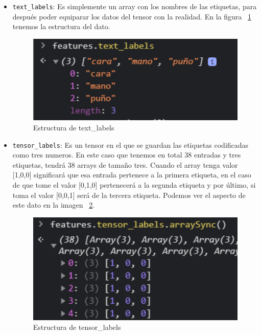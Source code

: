 \documentclass[a4paper, 12pt]{book}
\begin{document}
\begin{itemize}
  
	\item \texttt{text\_labels}: Es simplemente un array con los nombres de las etiquetas, para después poder equiparar los datos del tensor con la realidad. En la figura ~\ref{fig:textlabels} tenemos la estructura del dato.

\begin{figure}
	\centering
	\includegraphics[width=12cm, keepaspectratio]{img/textlabels}
	\caption{Estructura de text\_labels}				
	\label{fig:textlabels}
\end{figure}

	\item \texttt{tensor\_labels}: Es un tensor en el que se guardan las etiquetas codificadas como tres numeros. En este caso que tenemos en total 38 entradas y tres etiquetas, tendrá 38 arrays de tamaño tres. Cuando el array tenga valor [1,0,0] significará que esa entrada pertenece a la primera etiqueta, en el caso de que tome el valor [0,1,0] pertenecerá a la segunda etiqueta y por último, si toma el valor [0,0,1] será de la tercera etiqueta. Podemos ver el aspecto de este dato en la imagen ~\ref{fig:tensorlabels}.

\begin{figure}
	\centering
	\includegraphics[width=12cm, keepaspectratio]{img/tensorlabels}
	\caption{Estructura de tensor\_labels}				
	\label{fig:tensorlabels}
\end{figure}
	

\end{itemize}
\end{document}
